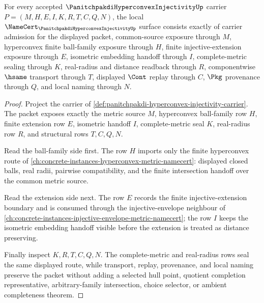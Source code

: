 \begin{theorem}
\label{thm:panitchpakdi-hyperconvex-injectivity-namecert-obligations}
For every accepted $\PanitchpakdiHyperconvexInjectivityUp$ carrier $P=(M,H,E,I,K,R,T,C,Q,N)$, the local $\NameCert_{\PanitchpakdiHyperconvexInjectivityUp}$ surface consists exactly of carrier admission for the displayed packet, common-source exposure through $M$, hyperconvex finite ball-family exposure through $H$, finite injective-extension exposure through $E$, isometric embedding handoff through $I$, complete-metric sealing through $K$, real-radius and distance readback through $R$, componentwise $\hsame$ transport through $T$, displayed $\Cont$ replay through $C$, $\Pkg$ provenance through $Q$, and local naming through $N$.
\end{theorem}
\begin{proof}
Project the carrier of \autoref{def:panitchpakdi-hyperconvex-injectivity-carrier}. The packet exposes exactly the metric source $M$, hyperconvex ball-family row $H$, finite extension row $E$, isometric handoff $I$, complete-metric seal $K$, real-radius row $R$, and structural rows $T,C,Q,N$.

Read the ball-family side first. The row $H$ imports only the finite hyperconvex route of \autoref{ch:concrete-instances-hyperconvex-metric-namecert}: displayed closed balls, real radii, pairwise compatibility, and the finite intersection handoff over the common metric source.

Read the extension side next. The row $E$ records the finite injective-extension boundary and is consumed through the injective-envelope neighbour of \autoref{ch:concrete-instances-injective-envelope-metric-namecert}; the row $I$ keeps the isometric embedding handoff visible before the extension is treated as distance preserving.

Finally inspect $K,R,T,C,Q,N$. The complete-metric and real-radius rows seal the same displayed route, while transport, replay, provenance, and local naming preserve the packet without adding a selected hull point, quotient completion representative, arbitrary-family intersection, choice selector, or ambient completeness theorem.
\end{proof}


